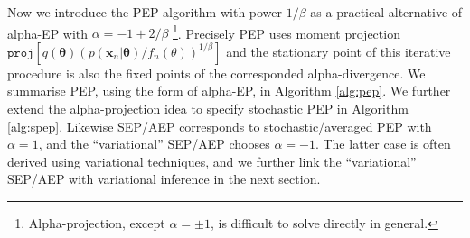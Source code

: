 \documentclass{article} %
\begin{document}
Now we introduce the PEP algorithm with power $1 / \beta$ as a practical alternative of alpha-EP with $\alpha = -1 + 2 / \beta$ \footnote{Alpha-projection, except $\alpha = \pm 1$, is difficult to solve directly in general.}. Precisely PEP uses moment projection $\mathtt{proj}[q(\bm{\theta}) (p(\bm{x}_n|\bm{\theta}) / f_n(\theta))^{1/\beta}]$ and the stationary point of this iterative procedure is also the fixed points of the corresponded alpha-divergence. 
%
We summarise PEP, using the form of alpha-EP, in Algorithm \ref{alg:pep}. We further extend the alpha-projection idea to specify stochastic PEP in Algorithm \ref{alg:spep}. Likewise SEP/AEP corresponds to stochastic/averaged PEP with $\alpha = 1$, and the ``variational'' SEP/AEP chooses $\alpha = -1$. The latter case is often derived using variational techniques, and we further link the ``variational'' SEP/AEP with variational inference in the next section.
\end{document}
